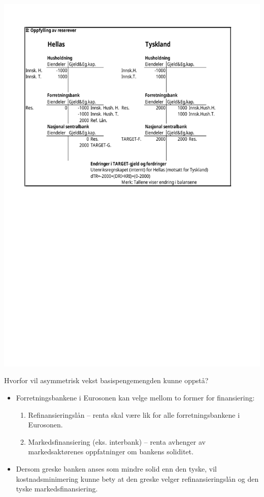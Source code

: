 \documentclass[notes=show notes]{beamer}
\begin{document}
\begin{frame}
\centering
\includegraphics[width=0.8\linewidth]{Fork2_delII}
\end{frame}
\begin{frame}{Hvorfor vil asymmetrisk vekst basispengemengden kunne oppst\aa ?}
\begin{itemize}
\item Forretningsbankene i Eurosonen kan velge mellom to former for finansiering: 
\begin{enumerate}
\item Refinansieringsl\aa n -- renta skal v\ae re lik for alle forretningsbankene i Eurosonen.
\item Markedsfinansiering (eks. interbank) --  renta avhenger av markedsakt\o renes oppfatninger om bankens soliditet.
\end{enumerate}
\item Dersom greske banken anses som mindre solid enn den tyske, vil kostnadsminimering kunne bety at den greske velger refinansieringsl\aa n og den tyske markedsfinansiering. 
\end{itemize}
\end{frame}
\end{document}
